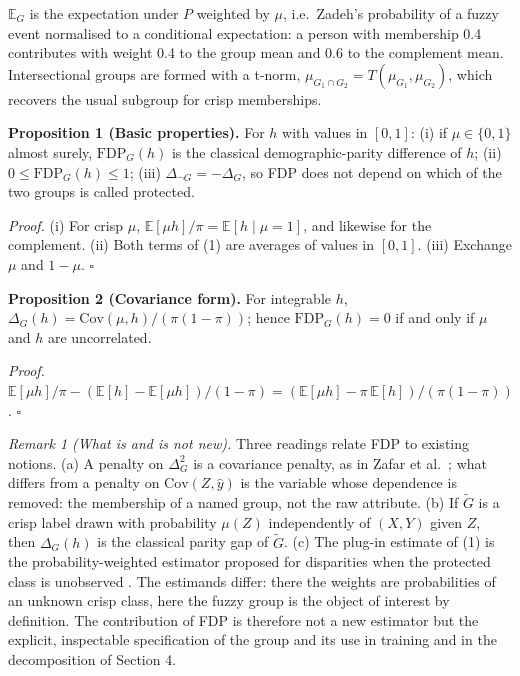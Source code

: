 \documentclass[pdflatex,sn-basic,Numbered,lineno]{sn-jnl}
\begin{document}
\(\mathbb{E}_G\) is the expectation under \(P\) weighted by \(\mu\), i.e.~Zadeh's probability of a fuzzy event \cite{zadeh68} normalised to a conditional expectation: a person with membership 0.4 contributes with weight 0.4 to the group mean and 0.6 to the complement mean. Intersectional groups are formed with a t-norm, \(\mu_{G_1 \cap G_2} = T(\mu_{G_1},\mu_{G_2})\), which recovers the usual subgroup for crisp memberships.

\textbf{Proposition 1 (Basic properties).} For \(h\) with values in \([0,1]\): (i) if \(\mu \in \{0,1\}\) almost surely, \(\mathrm{FDP}_{G}(h)\) is the classical demographic-parity difference of \(h\); (ii) \(0 \leq \mathrm{FDP}_{G}(h) \leq 1\); (iii) \(\Delta_{\neg G} = -\Delta_{G}\), so FDP does not depend on which of the two groups is called protected.

\emph{Proof.} (i) For crisp \(\mu\), \(\mathbb{E}[\mu h]/\pi = \mathbb{E}[h \mid \mu = 1]\), and likewise for the complement. (ii) Both terms of (1) are averages of values in \([0,1]\). (iii) Exchange \(\mu\) and \(1 - \mu\). \(\square\)

\textbf{Proposition 2 (Covariance form).} For integrable \(h\), \(\Delta_{G}(h) = \mathrm{Cov}(\mu,h)/(\pi(1 - \pi))\); hence \(\mathrm{FDP}_{G}(h) = 0\) if and only if \(\mu\) and \(h\) are uncorrelated.

\emph{Proof.} \(\mathbb{E}[\mu h]/\pi - (\mathbb{E}[h] - \mathbb{E}[\mu h])/(1 - \pi) = (\mathbb{E}[\mu h] - \pi\,\mathbb{E}[h])/(\pi(1 - \pi))\). \(\square\)

\emph{Remark 1 (What is and is not new).} Three readings relate FDP to existing notions. (a) A penalty on \(\Delta_G^2\) is a covariance penalty, as in Zafar et al.~\cite{zafar}; what differs from a penalty on \(\mathrm{Cov}(Z,\hat y)\) is the variable whose dependence is removed: the membership of a named group, not the raw attribute. (b) If \(\tilde G\) is a crisp label drawn with probability \(\mu(Z)\) independently of \((X,Y)\) given \(Z\), then \(\Delta_G(h)\) is the classical parity gap of \(\tilde G\). (c) The plug-in estimate of (1) is the probability-weighted estimator proposed for disparities when the protected class is unobserved \cite{chen2019,kallus2022}. The estimands differ: there the weights are probabilities of an unknown crisp class, here the fuzzy group is the object of interest by definition. The contribution of FDP is therefore not a new estimator but the explicit, inspectable specification of the group and its use in training and in the decomposition of Section 4.
\end{document}
